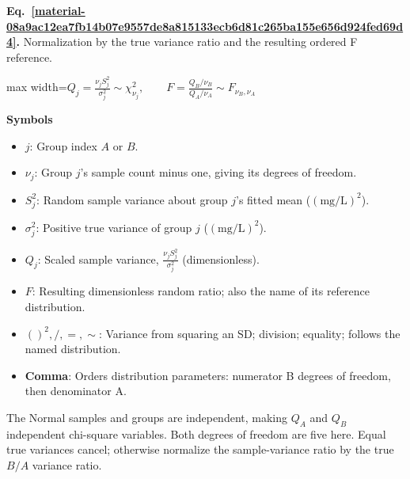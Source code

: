\documentclass[11pt,a4paper]{article}
\begin{document}
\par\medskip
\noindent\begin{minipage}{\linewidth}
\label{material-08a9ac12ea7fb14b07e9557de8a815133ecb6d81c265ba155e656d924fed69d4}
\noindent\textbf{Eq.~\ref*{material-08a9ac12ea7fb14b07e9557de8a815133ecb6d81c265ba155e656d924fed69d4}.} Normalization by the true variance ratio and the resulting ordered F reference.\par\nopagebreak
\begin{center}\begin{adjustbox}{max width=\linewidth}$\displaystyle Q_j=\frac{\nu_j S_j^2}{\sigma_j^2}\sim\chi^2_{\nu_j},\qquad F=\frac{Q_B/\nu_B}{Q_A/\nu_A}\sim F_{\nu_B,\nu_A}$\end{adjustbox}\end{center}

\par\noindent\textbf{Symbols}

\begin{itemize}\setlength{\itemsep}{1pt}\setlength{\parsep}{0pt}
\item \textbf{\(j\)}: Group index \(A\) or \(B\).
\item \textbf{\(ν_j\)}: Group \(j\)'s sample count minus one, giving its degrees of freedom.
\item \textbf{\(S_j^2\)}: Random sample variance about group \(j\)'s fitted mean (\(\mathrm{(mg/L)^2}\)).
\item \textbf{\(σ_j^2\)}: Positive true variance of group \(j\) (\(\mathrm{(mg/L)^2}\)).
\item \textbf{\(Q_j\)}: Scaled sample variance, \(\frac{ν_j S_j^2}{σ_j^2}\) (dimensionless).
\item \textbf{\(F\)}: Resulting dimensionless random ratio; also the name of its reference distribution.
\item \textbf{\(()^2, /, =, ∼\)}: Variance from squaring an SD; division; equality; follows the named distribution.
\item \textbf{Comma}: Orders distribution parameters: numerator B degrees of freedom, then denominator A.
\end{itemize}

The Normal samples and groups are independent, making \(Q_A\) and \(Q_B\) independent chi-square variables. Both degrees of freedom are five here. Equal true variances cancel; otherwise normalize the sample-variance ratio by the true \(B/A\) variance ratio.

\end{minipage}\par
\medskip
\end{document}
